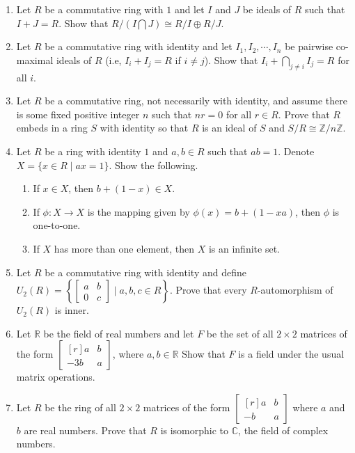 \documentclass{article}
\theoremstyle{definition}
\newcommand{\Z}{\mathbb{Z}}
\newcommand{\R}{\mathbb{R}}
\newcommand{\C}{\mathbb{C}}
\newcommand{\mat}[1]{\begin{bmatrix*}[r] #1 \end{bmatrix*}}
\begin{document}
\begin{enumerate}
            \item Let $R$ be a commutative ring with $1$ and let $I$ and $J$ be ideals of $R$ such that $I+J=R$. Show that $R/(I\bigcap J) \cong R/I \oplus R/J$.
            
            \item Let $R$ be a commutative ring with identity and let $I_1, I_2, \dotsb , I_n$ be pairwise co-maximal ideals of $R$ (i.e, $I_i+I_j=R$ if $i\neq j$). Show that $I_i+\bigcap_{j\neq i} I_j=R$ for all $i$.
            
            \item Let $R$ be a commutative ring, not necessarily with identity, and assume there is some fixed positive integer $n$ such that $nr=0$ for all $r\in R$. Prove that $R$ embeds in a ring $S$ with identity so that $R$ is an ideal of $S$ and $S/R\cong \Z/n\Z$.
            
            \item Let $R$ be a ring with identity $1$ and $a,b\in R$ such that $ab=1$. Denote $X=\{x\in R\mid  ax=1\}$. Show the following.
            
            \begin{enumerate}
                \item If $x\in X$, then $b+(1-x)\in X$.
                \item If $\phi:X\to X$ is the mapping given by $\phi(x)=b+(1-xa)$, then $\phi$ is one-to-one.
                \item If $X$ has more than one element, then $X$ is an infinite set.
            \end{enumerate}

            \item Let $R$ be a commutative ring with identity and define $U_2(R)=\left\{\begin{bmatrix} a&b\\0&c \end{bmatrix} \mid  a,b,c\in R \right\}$. Prove that every $R$-automorphism of $U_2(R)$ is inner.
            
            \item Let $\R$ be the field of real numbers and let $F$ be the set of all $2\times 2$ matrices of the form $\mat{a & b\\-3b&a}$, where $a,b\in \R$ Show that $F$ is a field under the usual matrix operations.
            
            \item Let $R$ be the ring of all $2\times 2$ matrices of the form $\mat{a &b\\-b&a}$ where $a$ and $b$ are real numbers. Prove that $R$ is isomorphic to $\C$, the field of complex numbers.
            

\end{enumerate}
\end{document}
